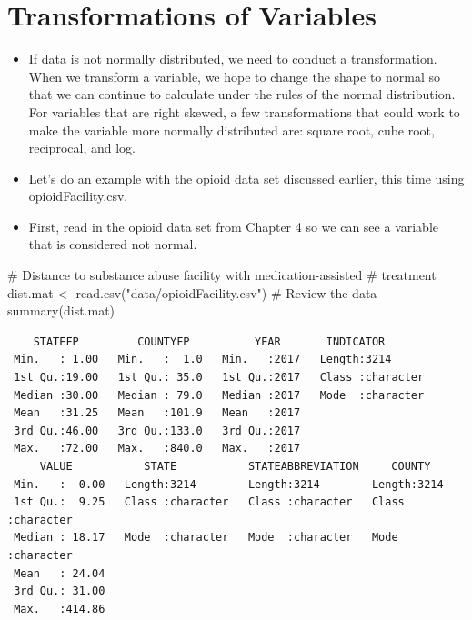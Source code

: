 \documentclass[
  letterpaper,
  DIV=11,
  numbers=noendperiod]{scrreprt}
\newenvironment{Shaded}{\begin{snugshade}}{\end{snugshade}}
\newcommand{\CommentTok}[1]{\textcolor[rgb]{0.37,0.37,0.37}{#1}}
\newcommand{\FunctionTok}[1]{\textcolor[rgb]{0.28,0.35,0.67}{#1}}
\newcommand{\NormalTok}[1]{\textcolor[rgb]{0.00,0.23,0.31}{#1}}
\newcommand{\OtherTok}[1]{\textcolor[rgb]{0.00,0.23,0.31}{#1}}
\newcommand{\StringTok}[1]{\textcolor[rgb]{0.13,0.47,0.30}{#1}}
\begin{document}

\chapter{Transformations of
Variables}\label{transformations-of-variables}

\begin{itemize}
\item
  If data is not normally distributed, we need to conduct a
  transformation. When we transform a variable, we hope to change the
  shape to normal so that we can continue to calculate under the rules
  of the normal distribution. For variables that are right skewed, a few
  transformations that could work to make the variable more normally
  distributed are: square root, cube root, reciprocal, and log.
\item
  Let's do an example with the opioid data set discussed earlier, this
  time using opioidFacility.csv.
\item
  First, read in the opioid data set from Chapter 4 so we can see a
  variable that is considered not normal.
\end{itemize}

\begin{Shaded}
\begin{Highlighting}[]
\CommentTok{\# Distance to substance abuse facility with medication{-}assisted}
\CommentTok{\# treatment}
\NormalTok{dist.mat }\OtherTok{\textless{}{-}} \FunctionTok{read.csv}\NormalTok{(}\StringTok{"data/opioidFacility.csv"}\NormalTok{)}
\CommentTok{\# Review the data}
\FunctionTok{summary}\NormalTok{(dist.mat)}
\end{Highlighting}
\end{Shaded}

\begin{verbatim}
    STATEFP         COUNTYFP          YEAR       INDICATOR        
 Min.   : 1.00   Min.   :  1.0   Min.   :2017   Length:3214       
 1st Qu.:19.00   1st Qu.: 35.0   1st Qu.:2017   Class :character  
 Median :30.00   Median : 79.0   Median :2017   Mode  :character  
 Mean   :31.25   Mean   :101.9   Mean   :2017                     
 3rd Qu.:46.00   3rd Qu.:133.0   3rd Qu.:2017                     
 Max.   :72.00   Max.   :840.0   Max.   :2017                     
     VALUE           STATE           STATEABBREVIATION     COUNTY         
 Min.   :  0.00   Length:3214        Length:3214        Length:3214       
 1st Qu.:  9.25   Class :character   Class :character   Class :character  
 Median : 18.17   Mode  :character   Mode  :character   Mode  :character  
 Mean   : 24.04                                                           
 3rd Qu.: 31.00                                                           
 Max.   :414.86                                                           
\end{verbatim}
\end{document}

